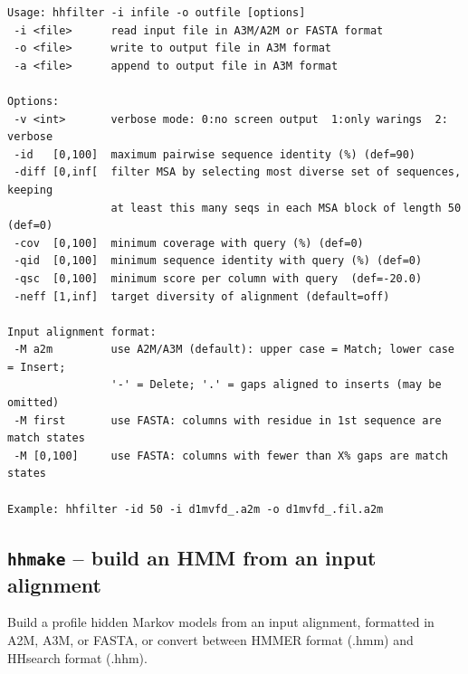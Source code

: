 \documentclass[11pt,a4paper]{article}
\begin{document}
\small 
\begin{verbatim}
Usage: hhfilter -i infile -o outfile [options]                  
 -i <file>      read input file in A3M/A2M or FASTA format                 
 -o <file>      write to output file in A3M format                         
 -a <file>      append to output file in A3M format                        

Options:                                                                  
 -v <int>       verbose mode: 0:no screen output  1:only warings  2: verbose
 -id   [0,100]  maximum pairwise sequence identity (%) (def=90)   
 -diff [0,inf[  filter MSA by selecting most diverse set of sequences, keeping 
                at least this many seqs in each MSA block of length 50 (def=0) 
 -cov  [0,100]  minimum coverage with query (%) (def=0) 
 -qid  [0,100]  minimum sequence identity with query (%) (def=0) 
 -qsc  [0,100]  minimum score per column with query  (def=-20.0)
 -neff [1,inf]  target diversity of alignment (default=off)

Input alignment format:                                                    
 -M a2m         use A2M/A3M (default): upper case = Match; lower case = Insert;
                '-' = Delete; '.' = gaps aligned to inserts (may be omitted)   
 -M first       use FASTA: columns with residue in 1st sequence are match states
 -M [0,100]     use FASTA: columns with fewer than X% gaps are match states   
                                                                          
Example: hhfilter -id 50 -i d1mvfd_.a2m -o d1mvfd_.fil.a2m          
\end{verbatim} 
\normalsize


\subsection{{\tt hhmake} -- build an HMM from an input alignment}

Build a profile hidden Markov models from an input alignment, formatted 
in A2M, A3M, or FASTA, or convert between HMMER format (.hmm) and 
HHsearch format (.hhm).   
\end{document}
